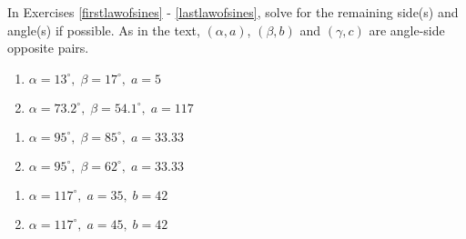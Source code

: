 \documentclass{ximera}
\begin{document}
	\author{Stitz-Zeager}



In Exercises \ref{firstlawofsines} - \ref{lastlawofsines}, solve for the remaining side(s) and angle(s) if possible.  As in the text, $(\alpha, a)$, $(\beta, b)$ and $(\gamma, c)$ are angle-side opposite pairs.

\begin{multicols}{2}

\begin{enumerate}

\item $\alpha = 13^{\circ}, \; \beta = 17^{\circ}, \; a = 5$ \label{firstlawofsines}
\item $\alpha = 73.2^{\circ}, \; \beta = 54.1^{\circ}, \; a = 117$

\setcounter{HW}{\value{enumi}}

\end{enumerate}

\end{multicols}

\begin{multicols}{2} 

\begin{enumerate}

\setcounter{enumi}{\value{HW}}

\item $\alpha = 95^{\circ}, \; \beta = 85^{\circ}, \; a = 33.33$
\item $\alpha = 95^{\circ}, \; \beta = 62^{\circ}, \; a = 33.33$

\setcounter{HW}{\value{enumi}}

\end{enumerate}

\end{multicols}

\begin{multicols}{2} 

\begin{enumerate}

\setcounter{enumi}{\value{HW}}

\item $\alpha = 117^{\circ}, \; a = 35, \; b = 42$
\item $\alpha = 117^{\circ}, \; a = 45, \; b = 42$

\setcounter{HW}{\value{enumi}}

\end{enumerate}

\end{multicols}
\end{document}
